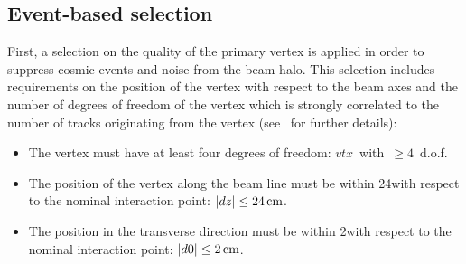 \subsection{Event-based selection}
\label{sec:EventBasedSelection}
First, a selection on the quality of the primary vertex is applied in order to suppress cosmic events and noise from the beam halo.
This selection includes requirements on the position of the vertex with respect to the beam axes and the number of degrees of freedom of the vertex which is strongly correlated to the number of tracks originating from the vertex (see~\cite{bib:CMS:Tracking_7TeV_PAS} for further details):  
\begin{itemize}
\renewcommand{\labelitemi}{\footnotesize{\ding{118}}}
\item The vertex must have at least four degrees of freedom: \mbox{$vtx$ with $\geq 4$ d.o.f.}
\item The position of the vertex along the beam line must be within 24\cm with respect to the nominal interaction point: \mbox{$|dz| \leq 24\,\text{cm}$.}
\item The position in the transverse direction must be within 2\cm with respect to the nominal interaction point: \mbox{$|d0| \leq 2\,\text{cm}$.}\\
\end{itemize}

